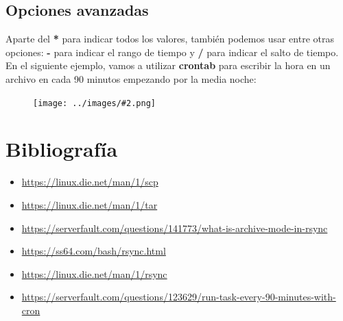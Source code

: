 \documentclass[twoside]{article}
\newcommand{\image}[2]{
\begin{figure}[H]
    \texttt{[image: ../images/\#2.png]}
    \centering
\end{figure}
}
\begin{document}
\subsection{Opciones avanzadas}
Aparte del \textbf{*} para indicar todos los valores, también podemos usar entre otras opciones: \textbf{-} para indicar el rango de tiempo y \textbf{/} para indicar el salto de tiempo. En el siguiente ejemplo, vamos a utilizar \textbf{crontab} para escribir la hora en un archivo en cada 90 minutos empezando por la media noche:
\image{8}{21}

\newpage
\section{Bibliografía}
\begin{itemize}
    \item \url{https://linux.die.net/man/1/scp}
    \item \url{https://linux.die.net/man/1/tar}
    \item \url{https://serverfault.com/questions/141773/what-is-archive-mode-in-rsync}
    \item \url{https://ss64.com/bash/rsync.html}
    \item \url{https://linux.die.net/man/1/rsync}
    \item \url{https://serverfault.com/questions/123629/run-task-every-90-minutes-with-cron}
\end{itemize}
\end{document}
